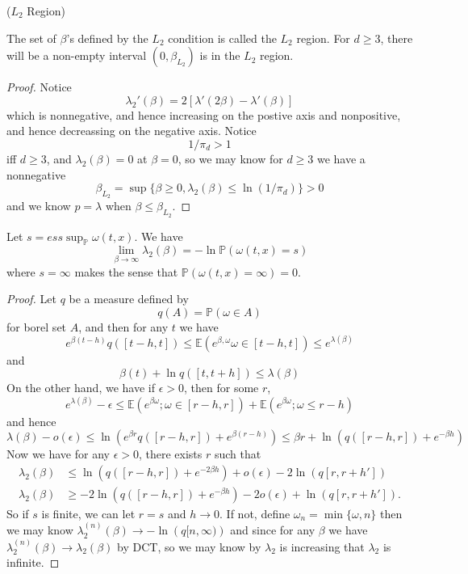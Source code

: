 \begin{definition}
    ($L_2$ Region)\par
    The set of $\beta$'s defined by the $L_2$ condition is called the $L_2$ region. For $d\geq 3$, there will be a non-empty interval $(0,\beta_{L_2})$ is in the $L_2$ region.
\end{definition}
\begin{proof}
    Notice
    \[
    \lambda_2'(\beta) = 2[\lambda'(2\beta) - \lambda'(\beta)]
    \]
    which is nonnegative, and hence increasing on the postive axis and nonpositive, and hence decreassing on the negative axis. Notice
    \[1/\pi_d > 1\]
    iff $d\geq 3$, and $\lambda_2(\beta) = 0$ at $\beta = 0$, so we may know for $d\geq 3$ we have a nonnegative
    \[
    \beta_{L_2} = \sup \{\beta \geq 0,\lambda_2(\beta) \leq \ln(1/\pi_d)\} > 0
    \]
    and we know $p = \lambda$ when $\beta \leq \beta_ {L_2}$. 
\end{proof}

\begin{corollary}
    Let $s= ess\sup_{\mathbb{P}}\omega(t,x)$. We have
    \[
    \lim_{\beta\to\infty} \lambda_2(\beta) = -\ln\mathbb{P}(\omega(t,x) = s)
    \]
    where $s = \infty$ makes the sense that $\mathbb{P}(\omega(t,x) = \infty) = 0$.
\end{corollary}
\begin{proof}
    Let $q$ be a measure defined by
    \[q(A) = \mathbb{P}(\omega \in A)\]
    for borel set $A$, and then for any $t$ we have
    \[
    e^{\beta(t-h)} q([t-h,t])\leq \mathbb{E}(e^{\beta,\omega} \omega \in [t-h,t]) \leq e^{\lambda(\beta)}
    \]
    and
    \[
    \beta(t) + \ln q([t,t+h]) \leq \lambda (\beta)
    \]
    On the other hand, we have if $\epsilon > 0$, then for some $r$,
    \[
    e^{\lambda(\beta)} -\epsilon \leq \mathbb{E}(e^{\beta\omega};\omega \in [r-h,r]) +\mathbb{E}(e^{\beta\omega};\omega \leq r-h)
    \]
    and hence
    \[
    \lambda(\beta) - o(\epsilon) \leq \ln(e^{\beta r} q([r-h,r])+e^{\beta(r-h)}) \leq \beta r + \ln(q([r-h,r])+e^{-\beta h})
    \]
    Now we have for any $\epsilon > 0$, there exists $r$ such that
    \[
    \begin{aligned}
        \lambda_2(\beta) &\leq \ln(q([r-h,r])+e^{-2\beta h}) + o(\epsilon) - 2\ln(q[r,r+h']) \\
        \lambda_2(\beta) & \geq  - 2\ln(q([r-h,r]) + e^{-\beta h}) - 2o(\epsilon) + \ln(q[r,r+h']).
    \end{aligned}
    \]
    So if $s$ is finite, we can let $r = s$ and $h \to 0$. If not, define $\omega_n = \min\{\omega,n\}$ then we may know $\lambda_2^{(n)}(\beta) \to -\ln(q{[n,\infty)})$ and since for any $\beta$ we have $\lambda_2^{(n)}(\beta) \to \lambda_2(\beta)$ by DCT, so we may know by $\lambda_2$ is increasing that $\lambda_2$ is infinite.
\end{proof}

